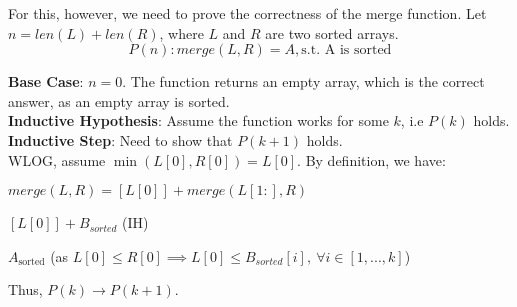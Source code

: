 \documentclass[a4paper]{article}
\begin{document}
\begin{enumerate}
\begin{enumerate}[label=\roman*]
For this, however, we need to prove the correctness of the merge function. Let $n = len(L) + len(R)$, where $L$ and $R$ are two sorted arrays.\\
$$P(n): merge(L, R) = A, \text{s.t. A is sorted}$$

\textbf{Base Case}: $n = 0$. The function returns an empty array, which is the correct answer, as an empty array is sorted. \\

\textbf{Inductive Hypothesis}: Assume the function works for some $k$, i.e $P(k)$ holds.\\

\textbf{Inductive Step}: Need to show that $P(k+1)$ holds.\\

WLOG, assume $\min(L[0], R[0]) = L[0]$. By definition, we have:
\begin{sollist}
    \item $merge(L, R) = [L[0]] + merge(L[1:], R)$
    \item $[L[0]] + B_{sorted}$ (IH)
    \item $A_{\text{sorted}}$ (as $L[0] \leq R[0] \implies L[0] \leq B_{sorted}[i],\ \forall i \in [1, ..., k]$)
\end{sollist}

Thus, $P(k) \rightarrow P(k+1)$.\\


\end{enumerate}
\end{enumerate}
\end{document}

